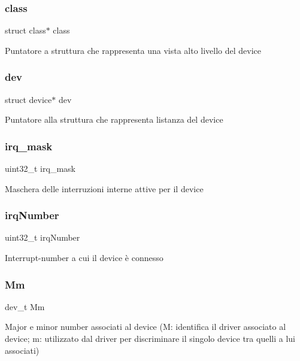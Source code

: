 \subsubsection{\texorpdfstring{class}{class}}
{\footnotesize\ttfamily struct class$\ast$ class}

Puntatore a struttura che rappresenta una vista alto livello del device \mbox{\label{structGPIO_acf6a82c73e7a9d99293d9ce0b8837faf}} 
\subsubsection{\texorpdfstring{dev}{dev}}
{\footnotesize\ttfamily struct device$\ast$ dev}

Puntatore alla struttura che rappresenta l\textquotesingle{}istanza del device \mbox{\label{structGPIO_a8ee102d0534084ca58a9cf9b8a3d9cc9}} 
\subsubsection{\texorpdfstring{irq\+\_\+mask}{irq\_mask}}
{\footnotesize\ttfamily uint32\+\_\+t irq\+\_\+mask}

Maschera delle interruzioni interne attive per il device \mbox{\label{structGPIO_a42a1593ebe61611c4e29413903a373a5}} 
\subsubsection{\texorpdfstring{irq\+Number}{irqNumber}}
{\footnotesize\ttfamily uint32\+\_\+t irq\+Number}

Interrupt-\/number a cui il device è connesso \mbox{\label{structGPIO_aeb60fb4e41b5f11f70ebe969361884f4}} 
\subsubsection{\texorpdfstring{Mm}{Mm}}
{\footnotesize\ttfamily dev\+\_\+t Mm}

Major e minor number associati al device (M\+: identifica il driver associato al device; m\+: utilizzato dal driver per discriminare il singolo device tra quelli a lui associati) \mbox{\label{structGPIO_a18c4eb95350c67ccb239a8a39c43c09a}} 
